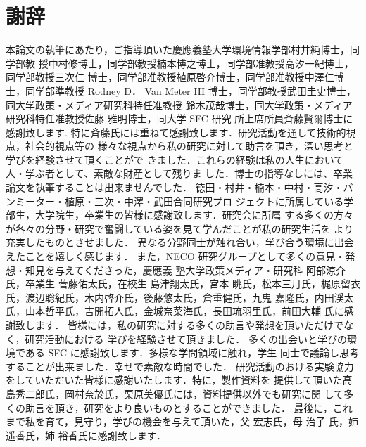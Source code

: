 \chapter*{謝辞}
\label{thanks}

本論文の執筆にあたり，ご指導頂いた慶應義塾大学環境情報学部村井純博士，同学部教
授中村修博士，同学部教授楠本博之博士，同学部准教授高汐一紀博士，同学部教授三次仁
博士，同学部准教授植原啓介博士，同学部准教授中澤仁博士，同学部準教授 Rodney D．
Van Meter III 博士，同学部教授武田圭史博士，同大学政策・メディア研究科特任准教授
鈴木茂哉博士，同大学政策・メディア研究科特任准教授佐藤 雅明博士，同大学 SFC 研究
所上席所員斉藤賢爾博士に感謝致します.
特に斉藤氏には重ねて感謝致します．研究活動を通して技術的視点，社会的視点等の
様々な視点から私の研究に対して助言を頂き，深い思考と学びを経験させて頂くことがで
きました．これらの経験は私の人生において人・学ぶ者として、素敵な財産として残りま
した．博士の指導なしには、卒業論文を執筆することは出来ませんでした．
徳田・村井・楠本・中村・高汐・バンミーター・植原・三次・中澤・武田合同研究プロ
ジェクトに所属している学部生，大学院生，卒業生の皆様に感謝致します．研究会に所属
する多くの方々が各々の分野・研究で奮闘している姿を見て学んだことが私の研究生活を
より充実したものとさせました．
異なる分野同士が触れ合い，学び合う環境に出会えたことを嬉しく感じます．
また，NECO 研究グループとして多くの意見・発想・知見を与えてくださった，慶應義
塾大学政策メディア・研究科 阿部涼介氏，卒業生 菅藤佑太氏，在校生 島津翔太氏，宮本
眺氏，松本三月氏，梶原留衣氏，渡辺聡紀氏，木内啓介氏，後藤悠太氏，倉重健氏，九鬼
嘉隆氏，内田渓太氏，山本哲平氏，吉開拓人氏，金城奈菜海氏，長田琉羽里氏，前田大輔
氏に感謝致します．
皆様には，私の研究に対する多くの助言や発想を頂いただけでなく，研究活動における
学びを経験させて頂きました．
多くの出会いと学びの環境である SFC に感謝致します．多様な学問領域に触れ，学生
同士で議論し思考することが出来ました．幸せで素敵な時間でした．
研究活動のおける実験協力をしていただいた皆様に感謝いたします．特に，製作資料を
提供して頂いた高島秀二郎氏，岡村奈於氏，栗原美優氏には，資料提供以外でも研究に関
して多くの助言を頂き，研究をより良いものとすることができました．
最後に，これまで私を育て，見守り，学びの機会を与えて頂いた，父 宏志氏，母 治子
氏，姉 遥香氏，姉 裕香氏に感謝致します．



